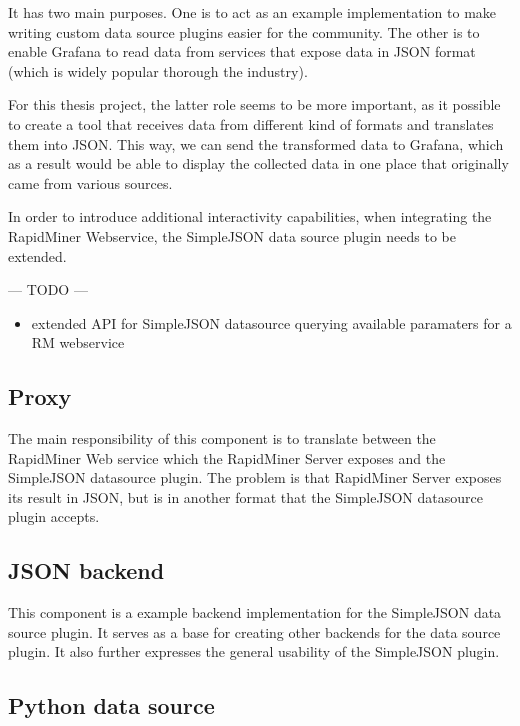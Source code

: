 It has two main purposes. One is to act as an example implementation to make writing custom data source plugins easier for the community. The other is to enable Grafana to read data from services that expose data in JSON format (which is widely popular thorough the industry).

For this thesis project, the latter role seems to be more important, as it possible to create a tool that receives data from different kind of formats and translates them into JSON. This way, we can send the transformed data to Grafana, which as a result would be able to display the collected data in one place that originally came from various sources.

In order to introduce additional interactivity capabilities, when integrating the RapidMiner Webservice, the SimpleJSON data source plugin needs to be extended. 

\begin{center}
	--- TODO ---
	\begin{itemize}
		\item extended API for SimpleJSON datasource
		\subitem querying available paramaters for a RM webservice
	\end{itemize}
\end{center}


\subsection{Proxy}

The main responsibility of this component is to translate between the RapidMiner Web service which the RapidMiner Server exposes and the SimpleJSON datasource plugin. The problem is that RapidMiner Server exposes its result in JSON, but is in another format that the SimpleJSON datasource plugin accepts.

\subsection{JSON backend}
This component is a example backend implementation for the SimpleJSON data source plugin. It serves as a base for creating other backends for the data source plugin. It also further expresses the general usability of the SimpleJSON plugin.

\subsection{Python data source}

